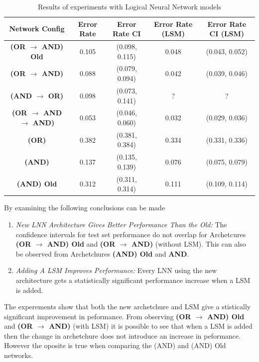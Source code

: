 \begin{table}[H]
	\begin{center}
		\begin{tabular}{| c | c | c | c | c |}
			\hline
			\textbf{Network Config} & \textbf{Error Rate} & \textbf{Error Rate CI} & \textbf{Error Rate (LSM)} & \textbf{Error Rate CI (LSM)}\\
			\hline
			\hline
			\textbf{(OR $\rightarrow$ AND) Old } & 0.105 & (0.098, 0.115) & 0.048 & (0.043, 0.052)\\
			\textbf{(OR $\rightarrow$ AND) } & 0.088 & (0.079, 0.094) & 0.042 & (0.039, 0.046)\\
			\textbf{(AND $\rightarrow$ OR) } & 0.098 & (0.073, 0.141) & ? & ?\\
			\textbf{(OR $\rightarrow$ AND $\rightarrow$ AND) } & 0.053 & (0.046, 0.060) & 0.032 & (0.029, 0.036)\\
			\textbf{(OR) } & 0.382 & (0.381, 0.384) & 0.334 & (0.331, 0.336)\\
			\textbf{(AND) } & 0.137 & (0.135, 0.139) & 0.076 & (0.075, 0.079)\\
			\textbf{(AND) Old} & 0.312 & (0.311, 0.314) & 0.111 & (0.109, 0.114)\\
			\hline
		\end{tabular}
	\end{center}
	\caption{Results of experiments with Logical Neural Network models}
	\label{tab:mnist-lnn-peformance-results}
\end{table}

By examining the following conclusions can be made
\begin{enumerate}
	\item \textit{New LNN Architecture Gives Better Performance Than the Old:} The confidence intervals for test set performance do not overlap for Archetcures \textbf{(OR $\rightarrow$ AND) Old} and \textbf{(OR $\rightarrow$ AND)} (without LSM). This can also be observed from Archetchures \textbf{(AND) Old} and \textbf{AND}.
	
	\item \textit{Adding A LSM Improves Performance:} Every LNN using the new architecture gets a statistically significant performance increase when a LSM is added.
\end{enumerate}

The experements show that both the new archetchure and LSM give a stistically significant improvement in peformance. From observing \textbf{(OR $\rightarrow$ AND) Old} and \textbf{(OR $\rightarrow$ AND)} (with LSM) it is possible to see that when a LSM is added then the change in archetchure does not introduce an increase in peformance. However the oposite is true when comparing the (AND) and (AND) Old networks.

